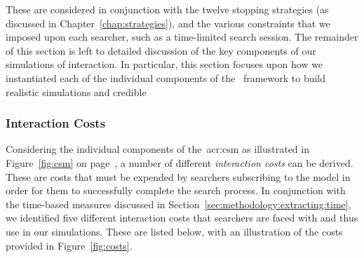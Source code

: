 These are considered in conjunction with the twelve stopping strategies (as discussed in Chapter~\ref{chap:strategies}), and the various constraints that we imposed upon each searcher, such as a time-limited search session. The remainder of this section is left to detailed discussion of the key components of our simulations of interaction. In particular, this section focuses upon how we instantiated each of the individual components of the \simiir~framework to build realistic simulations and credible 

\subsubsection{Interaction Costs}\label{sec:method:simulation:grounding:costs}
Considering the individual components of the~\gls{acr:csm} as illustrated in Figure~\ref{fig:csm} on page~\pageref{fig:csm}, a number of different \emph{interaction costs} can be derived. These are costs that must be expended by searchers subscribing to the model in order for them to successfully complete the search process. In conjunction with the time-based measures discussed in Section~\ref{sec:methodology:extracting:time}, we identified five different interaction costs that searchers are faced with and thus use in our simulations. These are listed below, with an illustration of the costs provided in Figure~\ref{fig:costs}.

